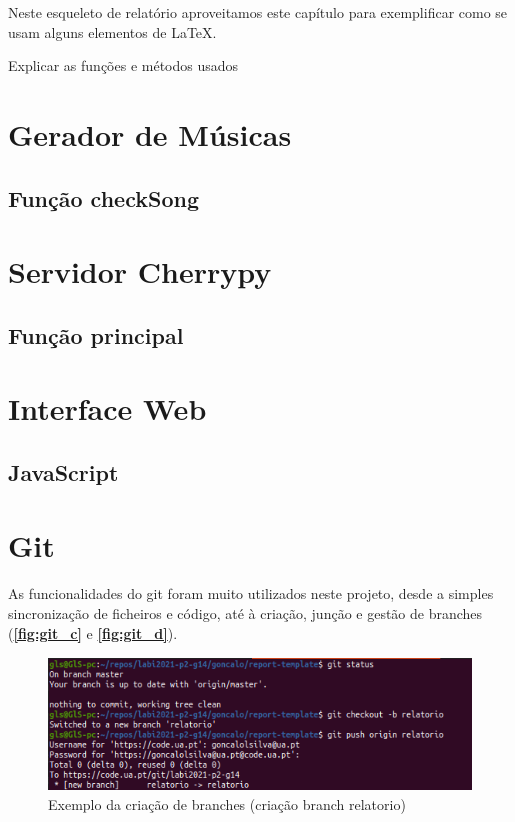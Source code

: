 \documentclass{report}
\begin{document}
Neste esqueleto de relatório aproveitamos este capítulo para exemplificar
como se usam alguns elementos de {\LaTeX}.

Explicar as funções e métodos usados

\section{Gerador de Músicas}
\label{sec:songEngine}

\subsection{Função checkSong}
\label{ssec:checkSong}

\section{Servidor Cherrypy}
\label{sec:serCherrypy}

\subsection{Função principal}
\label{ssec:princfunc}

\section{Interface Web}
\label{sec:Inte_Web}

\subsection{JavaScript}
\label{ssec:JS}

\section{Git}
\label{sec:git}
As funcionalidades do git foram muito utilizados neste projeto, desde a simples sincronização 
de ficheiros e código, até à criação, junção e gestão de branches (\textbf{\autoref{fig:git_c}} e 
\textbf{\autoref{fig:git_d}}). 
\cite{git}

\begin{figure}[!h]
\center 
\includegraphics[height=100pt]{img/git_1.png}
\caption{Exemplo da criação de branches (criação branch relatorio)}
\label{fig:git_c}
\end{figure}
\end{document}

